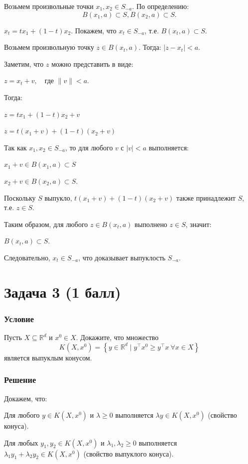 \documentclass[10pt]{article}
\begin{document}
Возьмем произвольные точки $x_1, x_2 \in S_{-a}$. По определению:
$$
B(x_1, a) \subset S, B(x_2, a) \subset S.
$$

$x_t = t x_1 + (1 - t) x_2$. Покажем, что $x_t \in S_{-a}$, т.е. $B(x_t, a) \subset S$.

Возьмем произвольную точку $z \in B(x_t, a)$. Тогда: $|z - x_t| < a.$

Заметим, что $z$ можно представить в виде:

$z = x_t + v, \quad \text{где } \|v\| < a.$

Тогда:

$z = t x_1 + (1 - t) x_2 + v$

$z = t(x_1 + v) + (1 - t)(x_2 + v)$


Так как $x_1, x_2 \in S_{-a}$, то для любого $v$ с $|v| < a$ выполняется:

$x_1 + v \in B(x_1, a) \subset S$

$x_2 + v \in B(x_2, a) \subset S.$


Поскольку $S$ выпукло, $t(x_1 + v) + (1 - t)(x_2 + v)$ также принадлежит $S$, 
т.е. $z \in S$.

Таким образом, для любого $z \in B(x_t, a)$ выполнено $z \in S$, значит:

$B(x_t, a) \subset S.$

Следовательно, $x_t \in S_{-a}$, что доказывает выпуклость $S_{-a}$.

\section{Задача 3 (1 балл)}

\subsubsection{Условие}

Пусть $X \subseteq \mathbb{R}^{d}$ и $x^{0} \in X$. Докажите, что множество
\[
K\left(X, x^{0}\right)=\left\{y \in \mathbb{R}^{d} \mid y^{\top} x^{0} \geq y^{\top} x \ \forall x \in X\right\}
\]
является выпуклым конусом.

\subsubsection{Решение}

Докажем, что:

Для любого $y \in K(X, x^0)$ и $\lambda \geq 0$ выполняется $\lambda y \in K(X, x^0)$ (свойство конуса).

Для любых $y_1, y_2 \in K(X, x^0)$ и $\lambda_1, \lambda_2 \geq 0$ выполняется $\lambda_1 y_1 + \lambda_2 y_2 \in K(X, x^0)$ (свойство выпуклого конуса).
\end{document}

